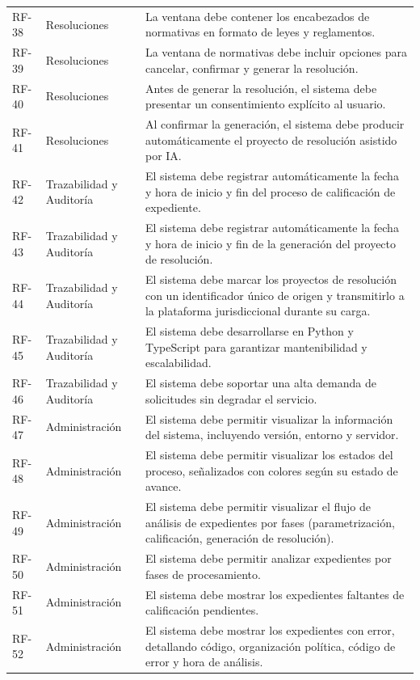 \documentclass[12pt,a4paper,oneside]{book}
\begin{document}
\begin{longtable}{@{}>{\centering\arraybackslash}p{2cm}
                    >{\centering\arraybackslash}p{3cm}
                    >{\raggedright\arraybackslash}p{10cm}@{}}
RF-38 & Resoluciones & La ventana debe contener los encabezados de normativas en formato de leyes y reglamentos. \\
RF-39 & Resoluciones & La ventana de normativas debe incluir opciones para cancelar, confirmar y generar la resolución. \\
RF-40 & Resoluciones & Antes de generar la resolución, el sistema debe presentar un consentimiento explícito al usuario. \\
RF-41 & Resoluciones & Al confirmar la generación, el sistema debe producir automáticamente el proyecto de resolución asistido por IA. \\
\midrule
RF-42 & Trazabilidad y Auditoría & El sistema debe registrar automáticamente la fecha y hora de inicio y fin del proceso de calificación de expediente. \\
RF-43 & Trazabilidad y Auditoría & El sistema debe registrar automáticamente la fecha y hora de inicio y fin de la generación del proyecto de resolución. \\
RF-44 & Trazabilidad y Auditoría & El sistema debe marcar los proyectos de resolución con un identificador único de origen y transmitirlo a la plataforma jurisdiccional durante su carga. \\
RF-45 & Trazabilidad y Auditoría & El sistema debe desarrollarse en Python y TypeScript para garantizar mantenibilidad y escalabilidad. \\
RF-46 & Trazabilidad y Auditoría & El sistema debe soportar una alta demanda de solicitudes sin degradar el servicio. \\
\midrule
RF-47 & Administración & El sistema debe permitir visualizar la información del sistema, incluyendo versión, entorno y servidor. \\
RF-48 & Administración & El sistema debe permitir visualizar los estados del proceso, señalizados con colores según su estado de avance. \\
RF-49 & Administración & El sistema debe permitir visualizar el flujo de análisis de expedientes por fases (parametrización, calificación, generación de resolución). \\
RF-50 & Administración & El sistema debe permitir analizar expedientes por fases de procesamiento. \\
RF-51 & Administración & El sistema debe mostrar los expedientes faltantes de calificación pendientes. \\
RF-52 & Administración & El sistema debe mostrar los expedientes con error, detallando código, organización política, código de error y hora de análisis. \\

\end{longtable}
\end{document}
